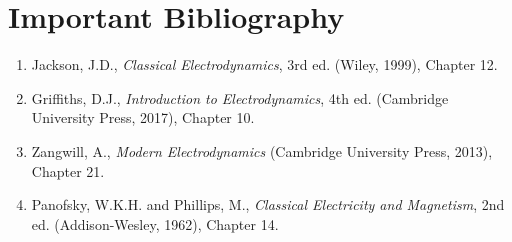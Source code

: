 \section*{Important Bibliography}

\begin{enumerate}
\item Jackson, J.D., \textit{Classical Electrodynamics}, 3rd ed. (Wiley, 1999), Chapter 12.
\item Griffiths, D.J., \textit{Introduction to Electrodynamics}, 4th ed. (Cambridge University Press, 2017), Chapter 10.
\item Zangwill, A., \textit{Modern Electrodynamics} (Cambridge University Press, 2013), Chapter 21.
\item Panofsky, W.K.H. and Phillips, M., \textit{Classical Electricity and Magnetism}, 2nd ed. (Addison-Wesley, 1962), Chapter 14.
\end{enumerate}

